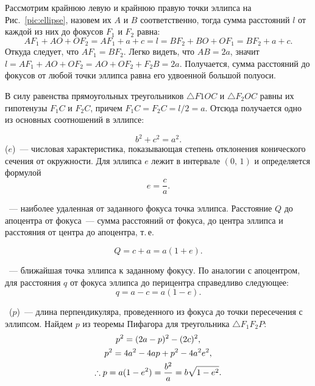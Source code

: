 Рассмотрим крайнюю левую и крайнюю правую точки эллипса на Рис.~\ref{pic:ellipse}, назовем их $A$ и $B$ соответственно, тогда сумма расстояний $l$ от каждой из них до фокусов $F_1$ и $F_2$ равна:
\begin{equation*}
	AF_1 + AO + OF_2 = AF_1 + a + c = l = BF_2 + BO + OF_1 = BF_2 + a + c.
\end{equation*}
Откуда следует, что $A F_1 = B F_2$. Легко видеть, что $AB = 2a$, значит $l = AF_1 + AO + OF_2 = AO + OF_2 + F_2B = 2a$. Получается, сумма расстояний до фокусов от любой точки эллипса равна его удвоенной большой полуоси.

В силу равенства прямоугольных треугольников $\triangle F1 O C$ и $\triangle F_2 O C$ равны их гипотенузы $F_1C$ и $F_2C$, причем $F_1C= F_2C = l/2 = a$. Отсюда получается одно из основных соотношений в эллипсе:

\begin{equation}
	b^2 + c^2 = a^2.
\end{equation}
 ($e$)~--- числовая
характеристика, показывающая степень отклонения конического сечения от окружности. Для эллипса $e$ лежит в интервале $(0, \, 1)$ и
определяется формулой
\begin{equation}
	e = \frac{c}{a}.
\end{equation}

~--- наиболее удаленная от заданного фокуса точка эллипса. Расстояние $Q$ до апоцентра от фокуса~--- сумма расстояний от фокуса, до центра эллипса и расстояния от центра до апоцентра, т.\,е.

\begin{equation}
	Q = c + a = a (1 + e).
\end{equation}

~--- ближайшая точка эллипса к заданному фокусу. По аналогии с апоцентром, для расстояния $q$ от фокуса эллипса до перицентра справедливо следующее:
\begin{equation}
	q = a - c = a (1 - e).
\end{equation}

~($p$)~--- длина перпендикуляра, проведенного из фокуса до точки пересечения с эллипсом. Найдем $p$ из теоремы Пифагора для треугольника $\triangle F_1 F_2 P$:
\begin{gather}
	p^2 = (2a - p)^2 - (2c)^2, \notag\\
	p^2 =  4a^2 - 4ap + p^2 - 4a^2e^2,\notag\\
	\therefore p = a (1 - e^2) = \frac{b^2}{a} = b \sqrt{1 - e^2}.
\end{gather}


